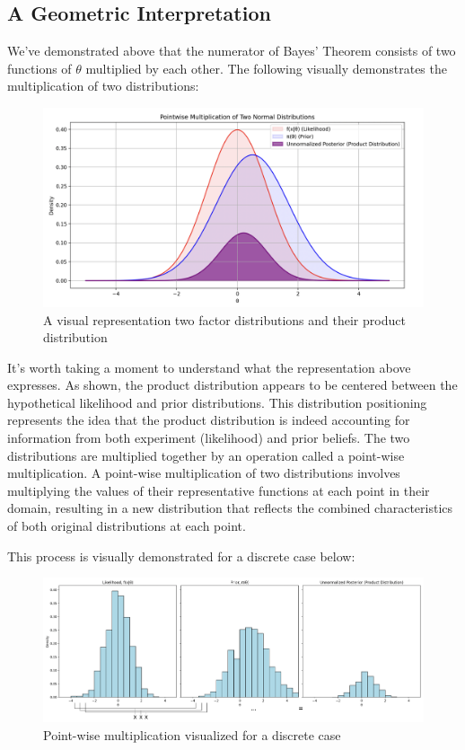 \documentclass[12pt]{article}
\begin{document}
\newpage
\subsection*{A Geometric Interpretation}
\noindent We've demonstrated above that the numerator of Bayes' Theorem consists of two functions of $\theta$ multiplied by each other. The following visually demonstrates the multiplication of two distributions:

\begin{figure}[h!]
\centering
\includegraphics[width=1.0\textwidth]{assets/visual_7.png} 
\caption{A visual representation two factor distributions and their product distribution}
\label{fig:cond_prob}
\end{figure}

\noindent It's worth taking a moment to understand what the representation above expresses. As shown, the product distribution appears to be centered between the hypothetical likelihood and prior distributions. This distribution positioning represents the idea that the product distribution is indeed accounting for information from both experiment (likelihood) and prior beliefs. The two distributions are multiplied together by an operation called a point-wise multiplication. A point-wise multiplication of two distributions involves multiplying the values of their representative functions at each point in their domain, resulting in a new distribution that reflects the combined characteristics of both original distributions at each point.

\newpage
\noindent This process is visually demonstrated for a discrete case below:

\begin{figure}[h!]
\centering
\includegraphics[width=1.0\textwidth]{assets/visual_8.png} 
\caption{Point-wise multiplication visualized for a discrete case}
\label{fig:cond_prob}
\end{figure}
\end{document}
